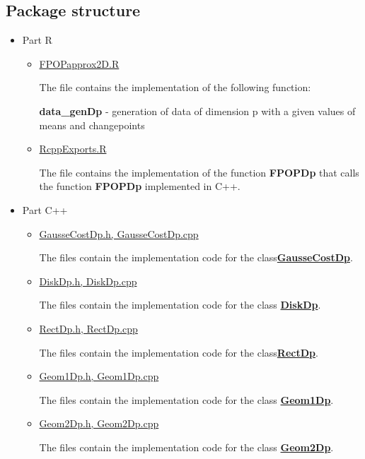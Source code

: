 \documentclass{report}
\begin{document}
	\subsection*{Package structure}
	\begin{itemize}
		\item  Part R
		\begin{itemize}
			\item \underline {FPOPapprox2D.R}
			
			The file contains the implementation of the following function:
			
			 {\bfseries data\_genDp} - generation of data of dimension p with a given values of means and changepoints
			 
			\item \underline {RcppExports.R} 
			
			The file contains the implementation of the function {\bfseries FPOPDp} that calls the function {\bfseries FPOPDp} implemented in C++.
			
		\end{itemize}
		\item Part C++
		\begin{itemize}
			\item \underline {GausseCostDp.h, GausseCostDp.cpp} 
			
			The files contain the implementation code for the class\hyperref [GausseCostDp]{\bfseries GausseCostDp}. 	
			
			\item \underline{DiskDp.h, DiskDp.cpp}
			
			The files contain the implementation code for the class \hyperref [DiskDp]{\bfseries DiskDp}. 
			
			\item  \underline{RectDp.h, RectDp.cpp}
			
			The files contain the implementation code for the class\hyperref [RectDp] {\bfseries RectDp}.
			 
			\item \underline{Geom1Dp.h, Geom1Dp.cpp} 
			
			The files contain the implementation code for the class \hyperref [Geom1Dp]{\bfseries Geom1Dp}. 
			
			\item \underline{Geom2Dp.h, Geom2Dp.cpp} 
			
			The files contain the implementation code for the class \hyperref [Geom2Dp]{\bfseries Geom2Dp}. 
			

\end{itemize}
\end{itemize}
\end{document}
